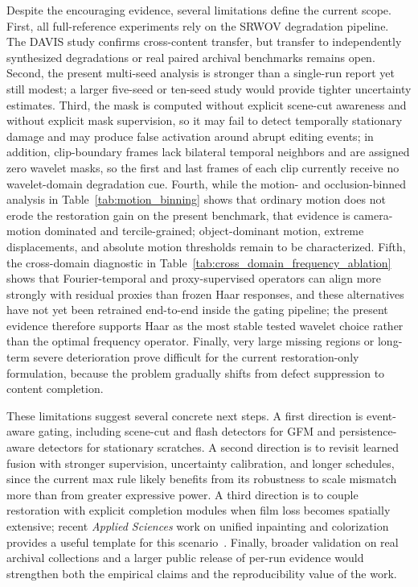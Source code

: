 \documentclass[applsci,article,submit,pdftex,moreauthors]{Definitions/mdpi}
\begin{document}
Despite the encouraging evidence, several limitations define the current scope. First, all full-reference experiments rely on the SRWOV degradation pipeline. The DAVIS study confirms cross-content transfer, but transfer to independently synthesized degradations or real paired archival benchmarks remains open. Second, the present multi-seed analysis is stronger than a single-run report yet still modest; a larger five-seed or ten-seed study would provide tighter uncertainty estimates. Third, the mask is computed without explicit scene-cut awareness and without explicit mask supervision, so it may fail to detect temporally stationary damage and may produce false activation around abrupt editing events; in addition, clip-boundary frames lack bilateral temporal neighbors and are assigned zero wavelet masks, so the first and last frames of each clip currently receive no wavelet-domain degradation cue. Fourth, while the motion- and occlusion-binned analysis in Table~\ref{tab:motion_binning} shows that ordinary motion does not erode the restoration gain on the present benchmark, that evidence is camera-motion dominated and tercile-grained; object-dominant motion, extreme displacements, and absolute motion thresholds remain to be characterized. Fifth, the cross-domain diagnostic in Table~\ref{tab:cross_domain_frequency_ablation} shows that Fourier-temporal and proxy-supervised operators can align more strongly with residual proxies than frozen Haar responses, and these alternatives have not yet been retrained end-to-end inside the gating pipeline; the present evidence therefore supports Haar as the most stable tested wavelet choice rather than the optimal frequency operator. Finally, very large missing regions or long-term severe deterioration prove difficult for the current restoration-only formulation, because the problem gradually shifts from defect suppression to content completion.

These limitations suggest several concrete next steps. A first direction is event-aware gating, including scene-cut and flash detectors for GFM and persistence-aware detectors for stationary scratches. A second direction is to revisit learned fusion with stronger supervision, uncertainty calibration, and longer schedules, since the current max rule likely benefits from its robustness to scale mismatch more than from greater expressive power. A third direction is to couple restoration with explicit completion modules when film loss becomes spatially extensive; recent \textit{Applied Sciences} work on unified inpainting and colorization provides a useful template for this scenario~\cite{yeo2025integration}. Finally, broader validation on real archival collections and a larger public release of per-run evidence would strengthen both the empirical claims and the reproducibility value of the work.
\end{document}
